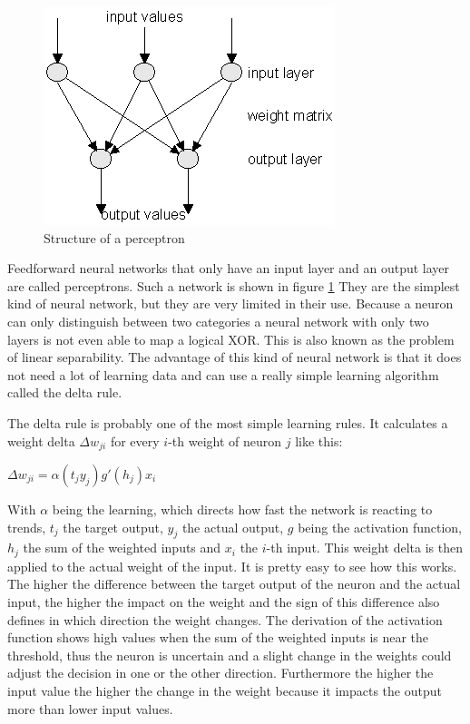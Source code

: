 \begin{figure}[ht]
	\centering
  \includegraphics[scale=0.9]{figures/perceptron.png}
	\caption[Structure of a perceptron]{Structure of a perceptron \protect\footnotemark}
	\label{perceptron}
\end{figure}

Feedforward neural networks that only have an input layer and an output layer are called perceptrons. Such a network is shown in figure \ref{perceptron} They are the simplest kind of neural network, but they are very limited in their use. Because a neuron can only distinguish between two categories a neural network with only two layers is not even able to map a logical XOR. This is also known as the problem of linear separability. The advantage of this kind of neural network is that it does not need a lot of learning data and can use a really simple learning algorithm called the delta rule.

The delta rule is probably one of the most simple learning rules. It calculates a weight delta $\Delta w_{ji}$ for every $i$-th weight of neuron $j$ like this:

\begin{center}
	$\Delta w_{ji} = \alpha (t_j  y_j)g'(h_j)x_i$
\end{center}

With $\alpha$ being the learning, which directs how fast the network is reacting to trends, $t_j$ the target output, $y_j$ the actual output, $g$ being the activation function, $h_j$ the sum of the weighted inputs and $x_i$ the $i$-th input. This weight delta is then applied to the actual weight of the input. It is pretty easy to see how this works. The higher the difference between the target output of the neuron and the actual input, the higher the impact on the weight and the sign of this difference also defines in which direction the weight changes. The derivation of the activation function shows high values when the sum of the weighted inputs is near the threshold, thus the neuron is uncertain and a slight change in the weights could adjust the decision in one or the other direction. Furthermore the higher the input value the higher the change in the weight because it impacts the output more than lower input values.

